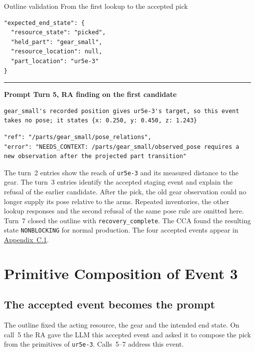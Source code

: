 \documentclass[preprint,12pt,authoryear]{elsarticle}
\let\code\nolinkurl
\newcommand{\sourcepart}[1]{\par\smallskip{\small\bfseries #1\par}\nobreak\smallskip}
\begin{document}
\begin{recordbox}[breakable]{Outline validation \enspace From the first lookup to the accepted pick}
\begin{minipage}[t]{0.483\linewidth}
\begin{lstlisting}[style=recorded]
"expected_end_state": {
  "resource_state": "picked",
  "held_part": "gear_small",
  "resource_location": null,
  "part_location": "ur5e-3"
}
\end{lstlisting}
\end{minipage}
\par\medskip\hrule\smallskip
{\small\bfseries Prompt \enspace Turn 5, RA finding on the first candidate}\par\smallskip
\begin{lstlisting}[style=recorded]
gear_small's recorded position gives ur5e-3's target, so this event takes no pose; it states {x: 0.250, y: 0.450, z: 1.243}
\end{lstlisting}
\sourcepart{Turn 6 prompt \enspace Missing context}
\begin{lstlisting}[style=recorded]
"ref": "/parts/gear_small/pose_relations",
"error": "NEEDS_CONTEXT: /parts/gear_small/observed_pose requires a new observation after the projected part transition"
\end{lstlisting}
\end{recordbox}

The turn~2 entries show the reach of \code{ur5e-3} and its measured distance to the gear. The turn~3 entries identify the accepted staging event and explain the refusal of the earlier candidate. After the pick, the old gear observation could no longer supply its pose relative to the arms. Repeated inventories, the other lookup responses and the second refusal of the same pose rule are omitted here. Turn~7 closed the outline with \code{recovery_complete}. The CCA found the resulting state \code{NONBLOCKING} for normal production. The four accepted events appear in \hyperref[sec:gazebo-slippage]{Appendix~C.1}.

\clearpage
\section{Primitive Composition of Event 3}
\setcounter{table}{0}
\renewcommand*{\theHtable}{B.\arabic{table}}
\subsection{The accepted event becomes the prompt}\label{sec:composition-prompt}

The outline fixed the acting resource, the gear and the intended end state.
On call~5 the RA gave the LLM this accepted event and asked it to compose the
pick from the primitives of \code{ur5e-3}. Calls~5--7 address this event.
\end{document}
